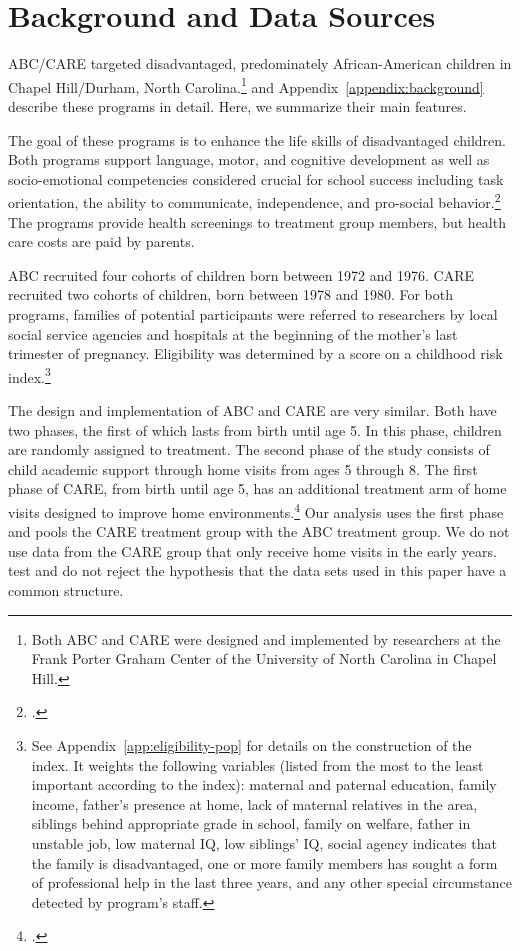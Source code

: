 \section[Background and Data Sources]{Background and Data Sources} \label{section:background}

ABC/CARE targeted disadvantaged, predominately African-American children in Chapel Hill/Durham, North Carolina.\footnote{Both ABC and CARE were designed and implemented by researchers at the Frank Porter Graham Center of the University of North Carolina in Chapel Hill.} \cite{Garcia_Heckman_Ziff_2017_Gender-Diff_UNPUBLISHED} and  Appendix~\ref{appendix:background} describe these programs in detail. Here, we summarize their main features.

The goal of these programs is to enhance the life skills of disadvantaged children. Both programs support language, motor, and cognitive development as well as socio-emotional competencies considered crucial for school success including task orientation, the ability to communicate, independence, and pro-social behavior.\footnote{\citet{Sparling_1974_Synth_Edu_Infant_SPEECH, Ramey_Collier_etal_1976_CarolinaAbecedarianProject, Ramey_etal_1985_Project-CARE_TiECSE, Wasik_Ramey_etal_1990_CD, Ramey-etal_2012-ABC}.} The programs provide health screenings to treatment group members, but health care costs are paid by parents.

ABC recruited four cohorts of children born between 1972 and 1976. CARE recruited two cohorts of children, born between 1978 and 1980. For both programs, families of potential participants were referred to researchers by local social service agencies and hospitals at the beginning of the mother's last trimester of pregnancy. Eligibility was determined by a score on a childhood risk index.\footnote{See  Appendix~\ref{app:eligibility-pop} for details on the construction of the index. It weights the following variables (listed from the most to the least important according to the index): maternal and paternal education, family income, father's presence at home, lack of maternal relatives in the area, siblings behind appropriate grade in school, family on welfare, father in unstable job, low maternal IQ, low siblings' IQ, social agency indicates that the family is disadvantaged, one or more family members has sought a form of professional help in the last three years, and any other special circumstance detected by program's staff.}

The design and implementation of ABC and CARE are very similar. Both have two phases, the first of which lasts from birth until age 5. In this phase, children are randomly assigned to treatment. The second phase of the study consists of child academic support through home visits from ages 5 through 8. The first phase of CARE, from birth until age 5, has an additional treatment arm of home visits designed to improve home environments.\footnote{\citet{Wasik_Ramey_etal_1990_CD}.} Our analysis uses the first phase and pools the CARE treatment group with the ABC treatment group. We do not use data from the CARE group that only receive home visits in the early years. \cite{Campbell_Conti_etal_2014_EarlyChildhoodInvestments} test and do not reject the hypothesis that the data sets used in this paper have a common structure.

